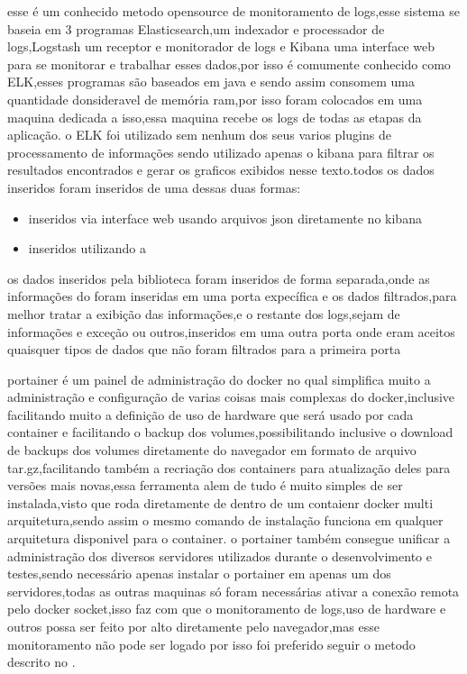 \documentclass[
	12pt,				%
	openright,			%
	oneside,			%
	a4paper,			%
	english,			%
	french,				%
	spanish,			%
	brazil,				%
	]{abntex2}
\begin{document}
esse é um conhecido metodo opensource de monitoramento de logs,esse sistema se baseia em 3 programas Elasticsearch,um indexador e processador de logs,Logstash um receptor e monitorador de logs e Kibana uma interface web para se monitorar e trabalhar esses dados,por isso é comumente conhecido como ELK,esses programas são baseados em java e sendo assim consomem uma quantidade donsideravel de memória ram,por isso foram colocados em uma maquina dedicada a isso,essa maquina recebe os logs de todas as etapas da aplicação.
o ELK foi utilizado sem nenhum dos seus varios plugins de processamento de informações sendo utilizado apenas o kibana para filtrar os resultados encontrados e gerar os graficos exibidos nesse texto.todos os dados inseridos foram inseridos de uma dessas duas formas:
\begin{itemize}
 \item inseridos via interface web usando arquivos json diretamente no kibana
 \item inseridos utilizando a 
\end{itemize}
os dados inseridos pela biblioteca  foram inseridos de forma separada,onde as informações do  foram inseridas em uma porta expecífica e os dados filtrados,para melhor tratar a exibição das informações,e o restante dos logs,sejam de informações e exceção ou outros,inseridos em uma outra porta onde eram aceitos quaisquer tipos de dados que não foram filtrados para a primeira porta


portainer é um painel de administração do docker no qual simplifica muito a administração e configuração de varias coisas mais complexas do docker,inclusive facilitando muito a definição de uso de hardware que será usado por cada container e facilitando o backup dos volumes,possibilitando inclusive o download de backups dos volumes diretamente do navegador em formato de arquivo tar.gz,facilitando também a recriação dos containers para atualização deles para versões mais novas,essa ferramenta alem de tudo é muito simples de ser instalada,visto que roda diretamente de dentro de um contaienr docker multi arquitetura,sendo assim o mesmo comando de instalação funciona em qualquer arquitetura disponivel para o container.
o portainer também consegue unificar a administração dos diversos servidores utilizados durante o desenvolvimento e testes,sendo necessário apenas instalar o portainer em apenas um dos servidores,todas as outras maquinas só foram necessárias ativar a conexão remota pelo docker socket,isso faz com que o monitoramento de logs,uso de hardware e outros possa ser feito por alto diretamente pelo navegador,mas esse monitoramento não pode ser logado por isso foi preferido seguir o metodo descrito no .
\end{document}
